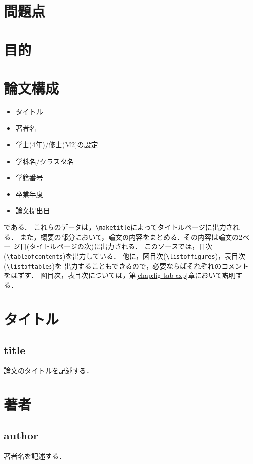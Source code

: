 \documentclass[11pt]{jreport}
\begin{document}
\section{問題点}

\section{目的}

\section{論文構成}

\begin{itemize}
  \item タイトル
  \item 著者名
  \item 学士(4年)/修士(M2)の設定
  \item 学科名/クラスタ名
  \item 学籍番号
  \item 卒業年度
  \item 論文提出日
\end{itemize}
である．
これらのデータは，\verb|\maketitle|によってタイトルページに出力される．
また，概要の部分において，論文の内容をまとめる．その内容は論文の2ペー
ジ目(タイトルページの次)に出力される．
このソースでは，目次(\verb|\tableofcontents|)を出力している．
他に，図目次(\verb|\listoffigures|)，表目次(\verb|\listoftables|)を
出力することもできるので，必要ならばそれぞれのコメントをはずす．
図目次，表目次については，第\ref{chap:fig-tab-exp}章において説明する．

\section{タイトル}
\subsection{title}
論文のタイトルを記述する．

\section{著者}
\subsection{author}
著者名を記述する．
\end{document}
